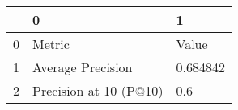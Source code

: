 \begin{tabular}{lll}
\toprule
{} &                       0 &         1 \\
\midrule
0 &                  Metric &     Value \\
1 &       Average Precision &  0.684842 \\
2 &  Precision at 10 (P@10) &       0.6 \\
\bottomrule
\end{tabular}
